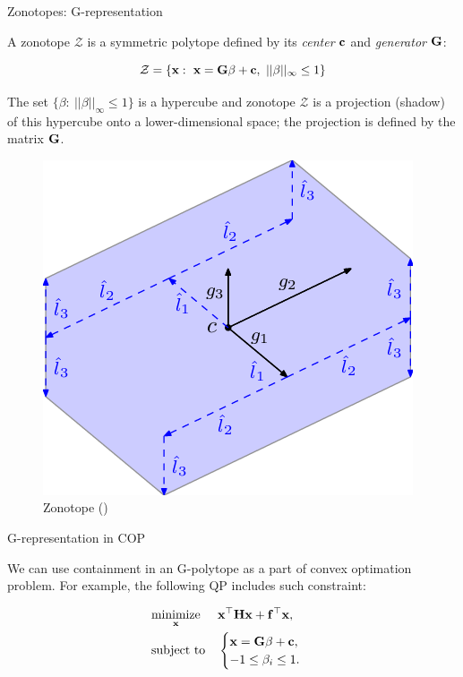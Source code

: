 \documentclass{beamer}
\begin{document}
\begin{frame}{Zonotopes: G-representation}
	\begin{flushleft}
		
		A zonotope $\mathcal{Z}$ is a symmetric polytope defined by its \emph{center} $\mathbf{c}$ and \emph{generator} $\mathbf{G}$:
		
		\begin{equation}
			\mathcal{Z} = \{ \bo{x}: \ \bo{x}=\bo{G}\beta+\bo{c}, \ ||\beta||_\infty \leq 1  \}
		\end{equation}
	
		The set $\{ \beta: \ ||\beta||_\infty \leq 1  \}$ is a hypercube and zonotope $\mathcal{Z}$ is a projection (shadow) of this hypercube onto a lower-dimensional space; the projection is defined by the matrix $\mathbf{G}$.
		
		\begin{figure}
			\centering
			\includegraphics[width=0.4\linewidth]{zonotope_example}
			\caption{Zonotope () }
			\label{fig:zonotopeexample}
		\end{figure}
		
		
	\end{flushleft}
\end{frame}




\begin{frame}{G-representation in COP}
	\begin{flushleft}
		
		We can use containment in an G-polytope as a part of convex optimation problem. For example, the following QP includes such constraint:
		
		\begin{equation}
			\begin{aligned}
				& \underset{\mathbf{x}}{\text{minimize}}
				& & \mathbf{x}^\top \mathbf{H} \mathbf{x} + \mathbf{f}^\top\mathbf{x}, \\
				& \text{subject to}
				& & \begin{cases}
					\mathbf{x} = \mathbf{G}\beta+\mathbf{c}, \\
					-1 \leq \beta_i \leq 1.
				\end{cases}
			\end{aligned}
		\end{equation}
		
	\end{flushleft}
\end{frame}
\end{document}
